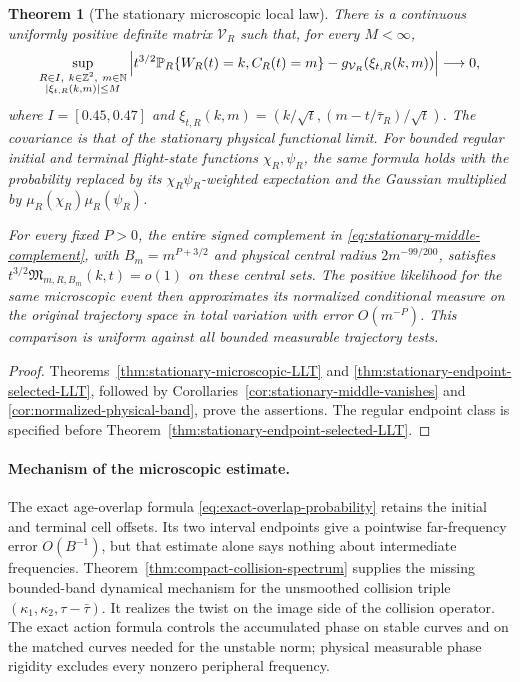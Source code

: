 \documentclass[11pt,reqno]{amsart}
\numberwithin{equation}{section}
\newtheorem{leadtheorem}{Theorem}
\theoremstyle{definition}\newtheorem{definition}[theorem]{Definition}
\theoremstyle{remark}\newtheorem{remark}[theorem]{Remark}
\begin{document}
\begin{leadtheorem}[The stationary microscopic local law]
\label{thm:intro-stationary-microscopic}
There is a continuous uniformly positive definite matrix $\mathcal V_R$
such that, for every $M<\infty$,
\begin{equation}\label{eq:intro-stationary-local-law}
 \sup_{\substack{R\in I,\ k\in\mathbb Z^2,\ m\in\mathbb N\\
                     |\xi_{t,R}(k,m)|\le M}}
 \left|t^{3/2}\mathbb P_R\{W_R(t)=k,C_R(t)=m\}
              -g_{\mathcal V_R}(\xi_{t,R}(k,m))\right|\longrightarrow0,
\end{equation}
where $I=[0.45,0.47]$ and
$\xi_{t,R}(k,m)=(k/\sqrt t,(m-t/\bar\tau_R)/\sqrt t)$.
The covariance is that of the stationary physical functional limit.
For bounded regular initial and terminal flight-state functions
$\chi_R,\psi_R$, the same formula holds with the probability replaced
by its $\chi_R\psi_R$-weighted expectation and the Gaussian multiplied
by $\mu_R(\chi_R)\mu_R(\psi_R)$.

For every fixed $P>0$, the entire signed complement in
\eqref{eq:stationary-middle-complement}, with $B_m=m^{P+3/2}$ and
physical central radius $2m^{-99/200}$, satisfies
$t^{3/2}\mathfrak M_{m,R,B_m}(k,t)=o(1)$ on these central sets.
The positive likelihood for the same microscopic event then approximates
its normalized conditional measure on the original trajectory space
in total variation with error $O(m^{-P})$. This comparison is uniform
against all bounded measurable trajectory tests.
\end{leadtheorem}
\begin{proof}
Theorems~\ref{thm:stationary-microscopic-LLT} and
\ref{thm:stationary-endpoint-selected-LLT}, followed by
Corollaries~\ref{cor:stationary-middle-vanishes} and
\ref{cor:normalized-physical-band}, prove the assertions. The regular
endpoint class is specified before
Theorem~\ref{thm:stationary-endpoint-selected-LLT}.
\end{proof}

\paragraph{Mechanism of the microscopic estimate.}
The exact age-overlap formula
\eqref{eq:exact-overlap-probability} retains the initial and terminal
cell offsets. Its two interval endpoints give a pointwise far-frequency
error $O(B^{-1})$, but that estimate alone says nothing about intermediate
frequencies. Theorem~\ref{thm:compact-collision-spectrum} supplies the
missing bounded-band dynamical mechanism for the unsmoothed collision
triple $(\kappa_1,\kappa_2,\tau-\bar\tau)$. It realizes the twist on
the image side of the collision operator. The exact action formula
controls the accumulated phase on stable curves and on the matched
curves needed for the unstable norm; physical measurable phase rigidity
excludes every nonzero peripheral frequency.
\end{document}
